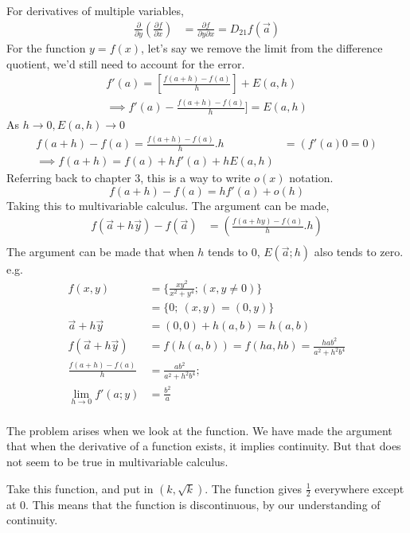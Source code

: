 \documentclass[twoside]{report}
\begin{document}
For derivatives of multiple variables,
\begin{align*}
   \frac{\partial }{\partial y} (\frac{\partial f}{\partial x}) &= \frac{\partial f}{\partial y \partial x} = D_{21} f(\vec{a})
\end{align*}
For the function $y=f(x)$, let's say we remove the limit from the difference quotient, we'd still need to account for the error.
\begin{align*}
   f'(a) = [\frac{f(a+h) - f(a)}{h}] + E(a,h) \\
   \implies f'(a) - \frac{f(a+h) - f(a)}{h}] = E(a,h)
\end{align*}
As $h \rightarrow 0, E(a,h) \rightarrow 0$
\begin{align*}
   f(a+h) - f(a) = \frac{f(a+h) - f(a)}{h}.h &=(f'(a) 0 = 0) \\
   \implies f(a+h) = f(a) + hf'(a) + hE(a,h)
\end{align*}
Referring back to chapter 3, this is a way to write $o(x)$ notation. 
\[
	f(a+h) - f(a) = hf'(a) + o(h)
\]
Taking this to multivariable calculus.
The argument can be made,
\begin{align*}
   f(\vec{a} + h\vec{y}) - f(\vec{a}) &= (\frac{f(a+hy)-f(a)}{h}.h) \\
\end{align*}
The argument can be made that when $h$ tends to $0$, $E(\vec{a};h)$ also tends to zero.
e.g. 
\begin{align*}
   f(x,y) &= \{\frac{xy^2}{x^2 + y^4}; (x,y \neq 0)\} \\
	  &= \{0; \ (x,y) = (0,y)\} \\
	 \vec{a} + h\vec{y} &= (0,0) + h(a,b) = h(a,b) \\
	 f(\vec{a} + h\vec{y}) &= f(h(a,b)) = f(ha,hb) = \frac{hab^2}{a^2 + h^2 b^4} \\
	 \frac{f(a+h) - f(a)}{h} &= \frac{ab^2}{a^2+h^2b^4}; \\
	 \lim_{h\rightarrow 0} f'(a;y) &= \frac{b^2}{a} \\
\end{align*}

The problem arises when we look at the function. We have made the argument that when the derivative of a function exists, it implies continuity. But that does not seem to be true in multivariable calculus. 

Take this function, and put in $(k,\sqrt{k})$. The function gives $\frac{1}{2}$ everywhere except at 0. This means that the function is discontinuous, by our understanding of continuity.
\end{document}
